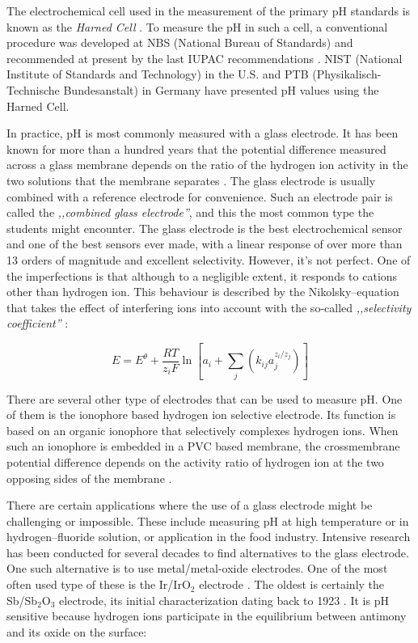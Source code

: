 \documentclass[manuscript=article, journal=jceda8]{achemso}
\begin{document}
The electrochemical cell used in the measurement of the primary pH standards is known as the \emph{Harned Cell} \cite{harned1958activity}.
To measure the pH in such a cell, a conventional procedure was developed at NBS (National Bureau of Standards) \cite{durst1975standardization} and recommended at present by the last IUPAC recommendations \cite{covington2002measurement}.
NIST (National Institute of Standards and Technology) in the U.S. and PTB (Physikalisch-Technische Bundesanstalt) in Germany have presented pH values using the Harned Cell. 

In practice, pH is most commonly measured with a glass electrode.
It has been known for more than a hundred years that the potential difference measured across a glass membrane depends on the ratio of the hydrogen ion activity in the two solutions that the membrane separates \cite{haber1909elektrische, haber1909concerning}.
The glass electrode is usually combined with a reference electrode for convenience.
Such an electrode pair is called the \emph{,,combined glass electrode''}, and this the most common type the students might encounter.
The glass electrode is the best electrochemical sensor and one of the best sensors ever made, with a linear response of over more than 13 orders of magnitude and excellent selectivity.
However, it's not perfect. One of the imperfections is that although to a negligible extent, it responds to cations other than hydrogen ion.
This behaviour is described by the Nikolsky--equation that takes the effect of interfering ions into account with the so-called \emph{,,selectivity coefficient''} \cite{nicolsky1937theory}:

\begin{equation}
E=E^\theta + \frac{RT}{z_iF} \ln \left [ a_i + \sum_{j} \left ( k_{ij}a_j^{z_i/z_j} \right ) \right ]
\end{equation}

There are several other type of electrodes that can be used to measure pH.
One of them is the ionophore based hydrogen ion selective electrode. 
Its function is based on an organic ionophore that selectively complexes hydrogen ions.
When such an ionophore is embedded in a PVC based membrane, the crossmembrane potential difference depends on the activity ratio of hydrogen ion at the two opposing sides of the membrane \cite{goldcamp2010inexpensive}.

There are certain applications where the use of a glass electrode might be challenging or impossible.
These include measuring pH at high temperature or in hydrogen--fluoride solution, or application in the food industry. 
Intensive research has been conducted for several decades to find alternatives to the glass electrode. One such alternative is to use metal/metal-oxide electrodes.
One of the most often used type of these is the Ir/IrO$_2$ electrode \cite{beyenal2004improved}.
The oldest is certainly the Sb/Sb$_2$O$_3$ electrode, its initial characterization dating back to 1923 \cite{uhl1923electrometric}.
It is pH sensitive because hydrogen ions participate in the equilibrium between antimony and its oxide on the surface:
\end{document}
